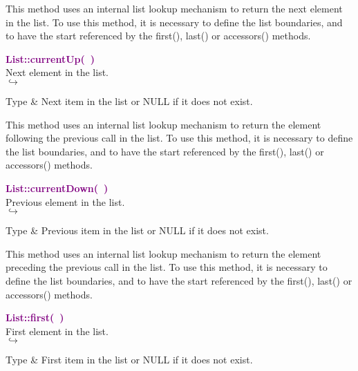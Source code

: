 This method uses an internal list lookup mechanism to return the next element in the list.
To use this method, it is necessary to define the list boundaries, and to have the start referenced by the first(), last() or accessors() methods.

\textcolor{purple}{\textbf{List::currentUp(~)}}\label{List::currentUp()}\\
Next element in the list.\\ \hspace*{5mm}$\hookrightarrow$
\vspace*{-2em}\begin{tcolorbox}[grow to left by=-1cm, width=\textwidth-1cm,myArgs,tabularx={l|R}]
Type & Next item in the list or NULL if it does not exist.
\end{tcolorbox}

This method uses an internal list lookup mechanism to return the element following the previous call in the list.
To use this method, it is necessary to define the list boundaries, and to have the start referenced by the first(), last() or accessors() methods.

\textcolor{purple}{\textbf{List::currentDown(~)}}\label{List::currentDown()}\\
Previous element in the list.\\ \hspace*{5mm}$\hookrightarrow$
\vspace*{-2em}\begin{tcolorbox}[grow to left by=-1cm, width=\textwidth-1cm,myArgs,tabularx={l|R}]
Type & Previous item in the list or NULL if it does not exist.
\end{tcolorbox}

This method uses an internal list lookup mechanism to return the element preceding the previous call in the list.
To use this method, it is necessary to define the list boundaries, and to have the start referenced by the first(), last() or accessors() methods.

\textcolor{purple}{\textbf{List::first(~)}}\label{List::first()}\\
First element in the list.\\ \hspace*{5mm}$\hookrightarrow$
\vspace*{-2em}\begin{tcolorbox}[grow to left by=-1cm, width=\textwidth-1cm,myArgs,tabularx={l|R}]
Type & First item in the list or NULL if it does not exist.
\end{tcolorbox}

